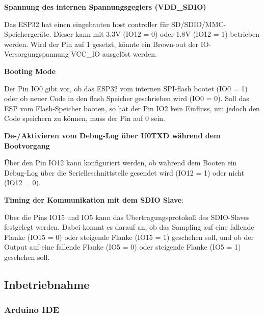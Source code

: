 \newpage

\textbf{Spannung des internen Spannungsgeglers (VDD\_SDIO)}

Das ESP32 hat einen eingebauten host controller für SD/SDIO/MMC-Speichergeräte. Dieser kann mit 3.3V (IO12 = 0) oder 1.8V (IO12 = 1) betrieben werden. Wird der Pin auf 1 gesetzt, könnte ein Brown-out der IO-Versorgungspannung VCC\_IO ausgelöst werden.

\textbf{Booting Mode}

Der Pin IO0 gibt vor, ob das ESP32 vom internen SPI-flash bootet (IO0 = 1) oder ob neuer Code in den flash Speicher geschrieben wird (IO0 = 0). Soll das ESP vom Flash-Speicher booten, so hat der Pin IO2 kein Einfluss, um jedoch den Code speichern zu können, muss der Pin auf 0 sein.

\textbf{De-/Aktivieren vom Debug-Log über U0TXD während dem Bootvorgang}

Über den Pin IO12 kann konfiguriert werden, ob während dem Booten ein Debug-Log über die Serielleschnittstelle gesendet wird (IO12 = 1) oder nicht (IO12 = 0).

\textbf{Timing der Kommunikation mit dem SDIO Slave}:

Über die Pins IO15 und IO5 kann das Übertragungsprotokoll des SDIO-Slaves festgelegt werden. Dabei kommt es darauf an, ob das Sampling auf eine fallende Flanke (IO15 = 0) oder steigende Flanke (IO15 = 1) geschehen soll, und ob der Output auf eine fallende Flanke (IO5 = 0) oder steigende Flanke (IO5 = 1) geschehen soll.

\cite{espressif_systems_esp32_2020} \cite{various_contributors_espressifesptool_2020}


\subsection{Inbetriebnahme}

\subsubsection{Arduino IDE}\label{Appendix:ESP32_Arduino_IDE}

